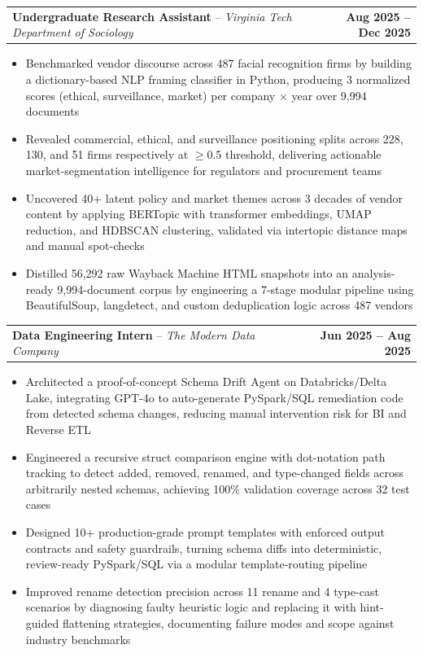 \documentclass[letterpaper,11pt]{article}
\makeatletter
\newcommand{\resumeItem}[1]{
  \item\small{{#1 \vspace{-2pt}}}
}
\newcommand{\resumeSubheading}[4]{%
  \vspace{-2pt}\item
    \begin{tabular*}{1.0\textwidth}[t]{l@{\extracolsep{\fill}}r}
      \textbf{#1}{ -- }\textit{\small #3}%
      \ifthenelse{\equal{#4}{}}{}{, \textit{\small #4}}%
      & \textbf{\small #2} \\
    \end{tabular*}\vspace{-7pt}
}
\newcommand{\resumeItemListStart}{\begin{itemize}}
\newcommand{\resumeItemListEnd}{\end{itemize}\vspace{-5pt}}
\makeatother
\begin{document}
        \resumeSubheading
            {Undergraduate Research Assistant}
            {Aug 2025 -- Dec 2025}
            {Virginia Tech Department of Sociology}
            {Blacksburg, VA}
            \resumeItemListStart
                \resumeItem{Benchmarked vendor discourse across 487 facial recognition firms by building a dictionary-based NLP framing classifier in Python, producing 3 normalized scores (ethical, surveillance, market) per company $\times$ year over 9,994 documents}
                \resumeItem{Revealed commercial, ethical, and surveillance positioning splits across 228, 130, and 51 firms respectively at $\geq$0.5 threshold, delivering actionable market-segmentation intelligence for regulators and procurement teams}
                \resumeItem{Uncovered 40+ latent policy and market themes across 3 decades of vendor content by applying BERTopic with transformer embeddings, UMAP reduction, and HDBSCAN clustering, validated via intertopic distance maps and manual spot-checks}
                \resumeItem{Distilled 56,292 raw Wayback Machine HTML snapshots into an analysis-ready 9,994-document corpus by engineering a 7-stage modular pipeline using BeautifulSoup, langdetect, and custom deduplication logic across 487 vendors}
            \resumeItemListEnd

        \resumeSubheading
            {Data Engineering Intern}
            {Jun 2025 -- Aug 2025}
            {The Modern Data Company}
            {Palo Alto, CA (Remote)}
            \resumeItemListStart
                \resumeItem{Architected a proof-of-concept Schema Drift Agent on Databricks/Delta Lake, integrating GPT-4o to auto-generate PySpark/SQL remediation code from detected schema changes, reducing manual intervention risk for BI and Reverse ETL}
                \resumeItem{Engineered a recursive struct comparison engine with dot-notation path tracking to detect added, removed, renamed, and type-changed fields across arbitrarily nested schemas, achieving 100\% validation coverage across 32 test cases}
                \resumeItem{Designed 10+ production-grade prompt templates with enforced output contracts and safety guardrails, turning schema diffs into deterministic, review-ready PySpark/SQL via a modular template-routing pipeline}
                \resumeItem{Improved rename detection precision across 11 rename and 4 type-cast scenarios by diagnosing faulty heuristic logic and replacing it with hint-guided flattening strategies, documenting failure modes and scope against industry benchmarks}
            \resumeItemListEnd
\end{document}
